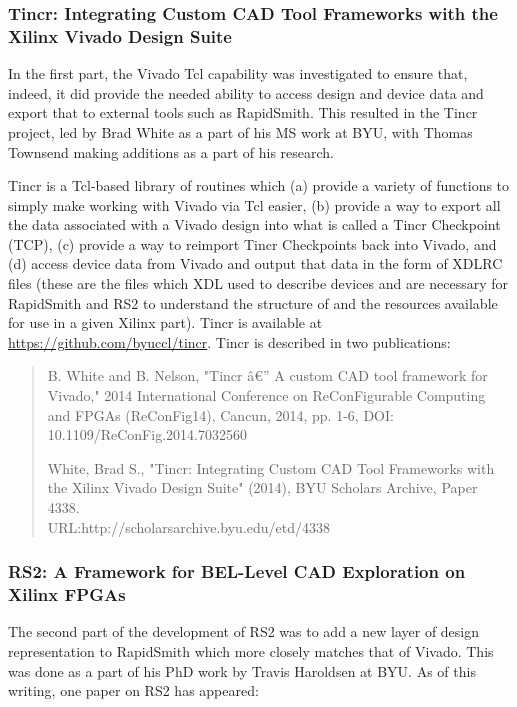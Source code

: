 \subsubsection{Tincr: Integrating Custom CAD Tool Frameworks with the Xilinx 
Vivado Design Suite} \label{sec:tincr}

In the first part, the Vivado Tcl capability was investigated to ensure that,
indeed, it did provide the needed ability to access design and device data and
export that to external tools such as RapidSmith.  This resulted in the Tincr
project, led by Brad White as a part of his MS work at BYU, with Thomas
Townsend making additions as a part of his research.

Tincr is a Tcl-based library of routines which (a) provide a variety of
functions to simply make working with Vivado via Tcl easier, (b) provide a way
to export all the data associated with a Vivado design into what is called a
Tincr Checkpoint (TCP), (c) provide a way to reimport Tincr Checkpoints back
into Vivado, and (d) access device data from Vivado and output that data in the
form of XDLRC files (these are the files which XDL used to describe devices and
are necessary for RapidSmith and RS2 to understand the structure of and the
resources available for use in a given Xilinx part).  Tincr is available at 
\href{https://github.com/byuccl/tincr}{\color{blue}https://github.com/byuccl/tincr}.
Tincr is described in two publications:

\begin{quotation}B. White and B. Nelson, "Tincr â€” A custom CAD tool framework
for Vivado," 2014 International Conference on ReConFigurable Computing and FPGAs (ReConFig14),
Cancun, 2014, pp. 1-6, DOI: 10.1109/ReConFig.2014.7032560

White, Brad S., "Tincr: Integrating Custom CAD Tool Frameworks with
the Xilinx Vivado Design Suite" (2014), BYU Scholars Archive, Paper 4338. 
\\URL:http://scholarsarchive.byu.edu/etd/4338
\end{quotation}

\subsubsection{RS2: A Framework for BEL-Level CAD Exploration on Xilinx FPGAs}
The second part of the development of RS2 was to add a new layer of design
representation to RapidSmith which more closely matches that of Vivado.  This
was done as a part of his PhD work by Travis Haroldsen at BYU.  As of this
writing, one paper on RS2 has appeared:

